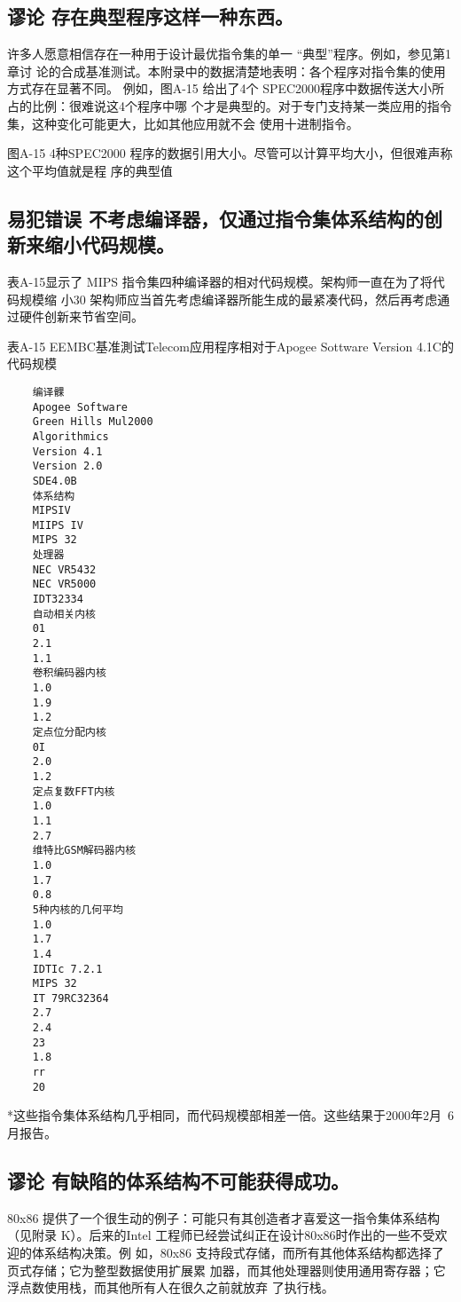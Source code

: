 \subsection{谬论 存在典型程序这样一种东西。}
许多人愿意相信存在一种用于设计最优指令集的单一 “典型”程序。例如，参见第1章讨
论的合成基准测试。本附录中的数据清楚地表明：各个程序对指令集的使用方式存在显著不同。
例如，图A-15 给出了4个 SPEC2000程序中数据传送大小所占的比例：很难说这4个程序中哪
个才是典型的。对于专门支持某一类应用的指令集，这种变化可能更大，比如其他应用就不会
使用十进制指令。

图A-15 4种SPEC2000 程序的数据引用大小。尽管可以计算平均大小，但很难声称这个平均值就是程
序的典型值
\subsection{易犯错误 不考虑编译器，仅通过指令集体系结构的创新来缩小代码规模。}
表A-15显示了 MIPS 指令集四种编译器的相对代码规模。架构师一直在为了将代码规模缩
小30%
架构师应当首先考虑编译器所能生成的最紧凑代码，然后再考虑通过硬件创新来节省空间。

表A-15 EEMBC基准測试Telecom应用程序相对于Apogee Sottware Version 4.1C的代码规模
\begin{verbatim}
    编译髁
    Apogee Software
    Green Hills Mul2000
    Algorithmics
    Version 4.1
    Version 2.0
    SDE4.0B
    体系结构
    MIPSIV
    MIIPS IV
    MIPS 32
    处理器
    NEC VR5432
    NEC VR5000
    IDT32334
    自动相关内核
    01
    2.1
    1.1
    卷积编码器内核
    1.0
    1.9
    1.2
    定点位分配内核
    0I
    2.0
    1.2
    定点复数FFT内核
    1.0
    1.1
    2.7
    维特比GSM解码器内核
    1.0
    1.7
    0.8
    5种内核的几何平均
    1.0
    1.7
    1.4
    IDTIc 7.2.1
    MIPS 32
    IT 79RC32364
    2.7
    2.4
    23
    1.8
    rr
    20
\end{verbatim}
*这些指令集体系结构几乎相同，而代码规模部相差一倍。这些结果于2000年2月~6月报告。
\subsection{谬论 有缺陷的体系结构不可能获得成功。}
80x86 提供了一个很生动的例子：可能只有其创造者才喜爱这一指令集体系结构（见附录
K）。后来的Intel 工程师已经尝试纠正在设计80x86时作出的一些不受欢迎的体系结构决策。例
如，80x86 支持段式存储，而所有其他体系结构都选择了页式存储；它为整型数据使用扩展累
加器，而其他处理器则使用通用寄存器；它浮点数使用栈，而其他所有人在很久之前就放弃
了执行栈。

